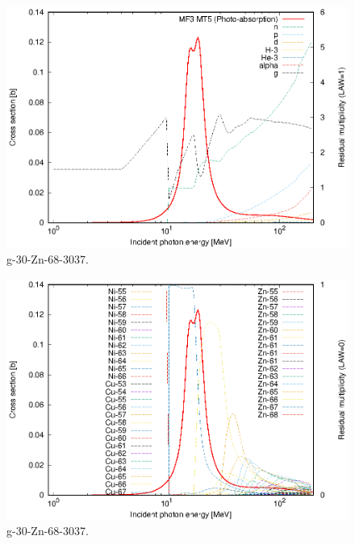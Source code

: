 \begin{figure}
 \includegraphics[width=\linewidth]{eps/g_30-Zn-68_3037.eps}
  \caption{g-30-Zn-68-3037.}
\end{figure}
\begin{figure}
 \includegraphics[width=\linewidth]{eps-law0/g_30-Zn-68_3037.eps}
 \caption{g-30-Zn-68-3037.}
\end{figure}
\newpage \clearpage

